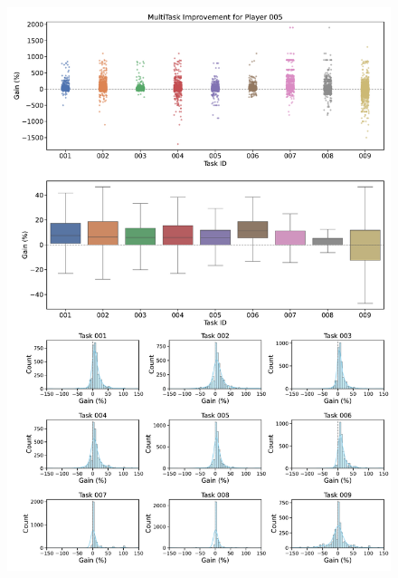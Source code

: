\begin{figure}[ht]
  \centering
  \includegraphics[width=\textwidth]{figures/gain_validity/multitask/multitask_gain_player_00005.pdf}
\end{figure}
\clearpage

